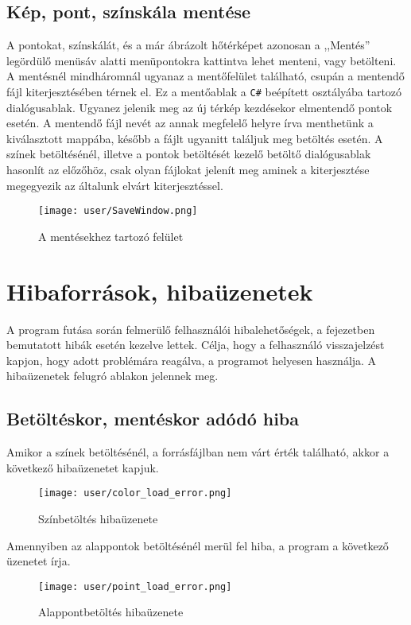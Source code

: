 		
		\subsection{Kép, pont, színskála mentése}
			A pontokat, színskálát, és a már ábrázolt hőtérképet azonosan a ,,Mentés'' legördülő menüsáv alatti menüpontokra kattintva lehet menteni, vagy betölteni. A mentésnél mindháromnál ugyanaz a mentőfelület található, csupán a mentendő fájl kiterjesztésében térnek el. Ez a mentőablak a \texttt{C\#} beépített osztályába tartozó dialógusablak. Ugyanez jelenik meg az új térkép kezdésekor elmentendő pontok esetén. A mentendő fájl nevét az annak megfelelő helyre írva menthetünk a kiválasztott mappába, később a fájlt ugyanitt találjuk meg betöltés esetén.  A színek betöltésénél, illetve a pontok betöltését kezelő betöltő dialógusablak hasonlít az előzőhöz, csak olyan fájlokat jelenít meg aminek a kiterjesztése megegyezik az általunk elvárt kiterjesztéssel. 
			\begin{figure}[ht]
				\centering
				\texttt{[image: user/SaveWindow.png]}
				\caption{A mentésekhez tartozó felület}
			\end{figure}
	\section{Hibaforrások, hibaüzenetek}
		
		A program futása során felmerülő felhasználói hibalehetőségek, a fejezetben bemutatott hibák esetén kezelve lettek. Célja, hogy a felhasználó visszajelzést kapjon, hogy adott problémára reagálva, a programot helyesen használja. A hibaüzenetek felugró ablakon jelennek meg.
		
		\subsection{Betöltéskor, mentéskor adódó hiba}
			Amikor a színek betöltésénél, a forrásfájlban nem várt érték található, akkor a következő hibaüzenetet kapjuk.
			\begin{figure}[ht]
				\centering
				\texttt{[image: user/color\_load\_error.png]}
				\caption{Színbetöltés hibaüzenete}
			\end{figure}
				
			Amennyiben az alappontok betöltésénél merül fel hiba, a program a következő üzenetet írja.
			\begin{figure}[ht]
				\centering
				\texttt{[image: user/point\_load\_error.png]}
				\caption{Alappontbetöltés hibaüzenete}
			\end{figure}
				
